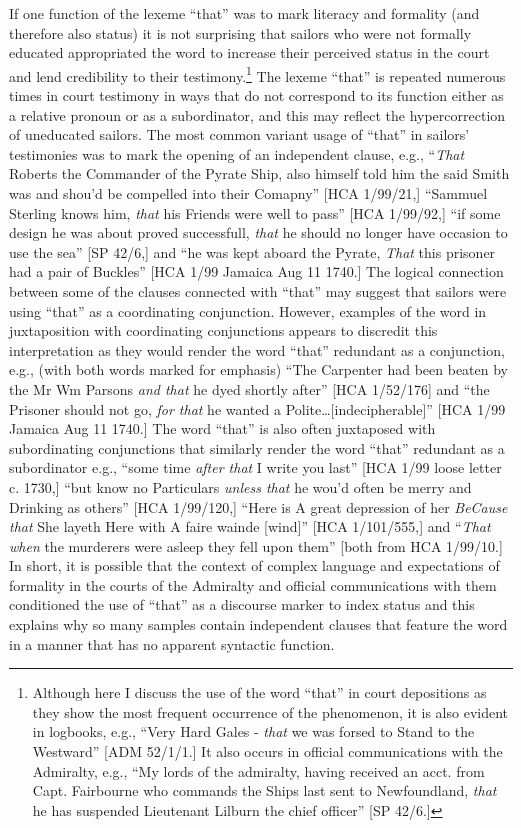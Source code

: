   If one function of the lexeme “that” was to mark literacy and formality (and therefore also status) it is not surprising that sailors who were not formally educated appropriated the word to increase their perceived status in the court and lend credibility to their testimony.\footnote{Although here I discuss the use of the word “that” in court depositions as they show the most frequent occurrence of the phenomenon, it is also evident in logbooks, e.g., “Very Hard Gales - \textit{that} we was forsed to Stand to the Westward” [ADM 52/1/1.] It also occurs in official communications with the Admiralty, e.g., “My lords of the admiralty, having received an acct. from Capt. Fairbourne who commands the Ships last sent to Newfoundland, \textit{that} he has suspended Lieutenant Lilburn the chief officer” [SP 42/6.]}   The lexeme “that” is repeated numerous times in court testimony in ways that do not correspond to its function either as a relative pronoun or as a subordinator, and this may reflect the hypercorrection of uneducated sailors. The most common variant usage of “that” in sailors’ testimonies was to mark the opening of an independent clause, e.g., “\textit{That} Roberts the Commander of the Pyrate Ship, also himself told him the said Smith was and shou’d be compelled into their Comapny” [HCA 1/99/21,] “Sammuel Sterling knows him, \textit{that} his Friends were well to pass” [HCA 1/99/92,] “if some design he was about proved successfull, \textit{that} he should no longer have occasion to use the sea” [SP 42/6,] and “he was kept aboard the Pyrate, \textit{That} this prisoner had a pair of Buckles” [HCA 1/99 Jamaica Aug 11 1740.] The logical connection between some of the clauses connected with “that” may suggest that sailors were using “that” as a coordinating conjunction. However, examples of the word in juxtaposition with coordinating conjunctions appears to discredit this interpretation as they would render the word “that” redundant as a conjunction, e.g., (with both words marked for emphasis) “The Carpenter had been beaten by the Mr Wm Parsons \textit{and that} he dyed shortly after” [HCA 1/52/176] and “the Prisoner should not go, \textit{for that} he wanted a Polite…[indecipherable]” [HCA 1/99 Jamaica Aug 11 1740.] The word “that” is also often juxtaposed with subordinating conjunctions that similarly render the word “that” redundant as a subordinator e.g., “some time \textit{after that} I write you last” [HCA 1/99 loose letter c. 1730,] “but know no Particulars \textit{unless that} he wou’d often be merry and Drinking as others” [HCA 1/99/120,] “Here is A great depression of her \textit{BeCause that} She layeth Here with A faire wainde [wind]” [HCA 1/101/555,] and “\textit{That when} the murderers were asleep they fell upon them” [both from HCA 1/99/10.] In short, it is possible that the context of complex language and expectations of formality in the courts of the Admiralty and official communications with them conditioned the use of “that” as a discourse marker to index status and this explains why so many samples contain independent clauses that feature the word in a manner that has no apparent syntactic function.

